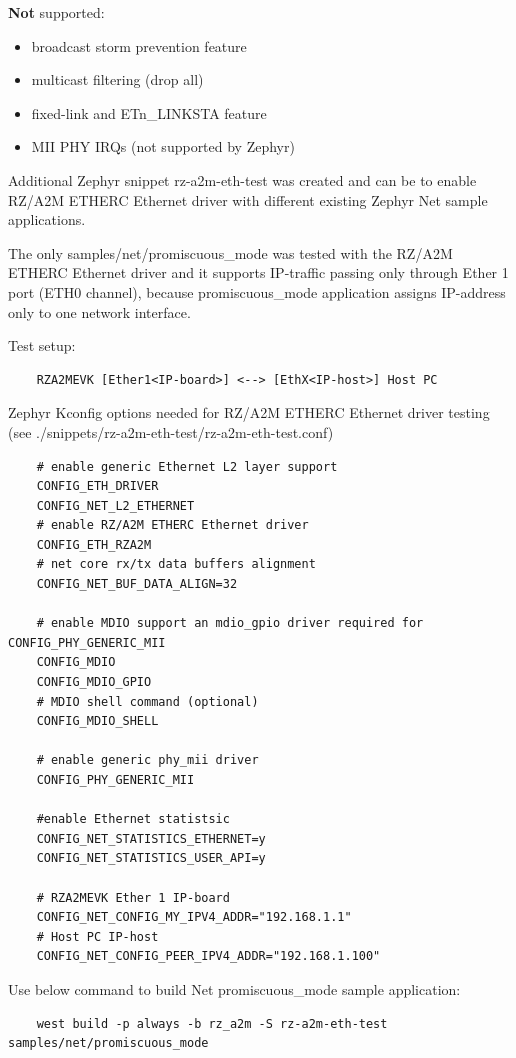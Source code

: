 \documentclass[11pt,a4paper,oneside]{article}
\begin{document}
\textbf{Not} supported:
\begin{itemize}
	\item  broadcast storm prevention feature
	\item  multicast filtering (drop all)
	\item  fixed-link and ETn\_LINKSTA feature
	\item  MII PHY IRQs (not supported by Zephyr)
\end{itemize}

Additional Zephyr snippet rz-a2m-eth-test was created and can be to enable RZ/A2M ETHERC Ethernet driver with different existing Zephyr Net sample applications.

The only samples/net/promiscuous\_mode was tested with the RZ/A2M ETHERC Ethernet driver and it supports IP-traffic passing only through Ether 1 port (ETH0 channel), because promiscuous\_mode application assigns IP-address only to one network interface.

Test setup:
\begin{lstlisting}
	RZA2MEVK [Ether1<IP-board>] <--> [EthX<IP-host>] Host PC
\end{lstlisting}

Zephyr Kconfig options needed for RZ/A2M ETHERC Ethernet driver testing (see ./snippets/rz-a2m-eth-test/rz-a2m-eth-test.conf)

\begin{lstlisting}
	# enable generic Ethernet L2 layer support
	CONFIG_ETH_DRIVER
	CONFIG_NET_L2_ETHERNET
	# enable RZ/A2M ETHERC Ethernet driver
	CONFIG_ETH_RZA2M
	# net core rx/tx data buffers alignment
	CONFIG_NET_BUF_DATA_ALIGN=32

	# enable MDIO support an mdio_gpio driver required for CONFIG_PHY_GENERIC_MII
	CONFIG_MDIO
	CONFIG_MDIO_GPIO
	# MDIO shell command (optional)
	CONFIG_MDIO_SHELL

	# enable generic phy_mii driver
	CONFIG_PHY_GENERIC_MII

	#enable Ethernet statistsic
	CONFIG_NET_STATISTICS_ETHERNET=y
	CONFIG_NET_STATISTICS_USER_API=y

	# RZA2MEVK Ether 1 IP-board
	CONFIG_NET_CONFIG_MY_IPV4_ADDR="192.168.1.1"
	# Host PC IP-host
	CONFIG_NET_CONFIG_PEER_IPV4_ADDR="192.168.1.100"
\end{lstlisting}

Use below command to build Net promiscuous\_mode sample application:

\begin{lstlisting}
	west build -p always -b rz_a2m -S rz-a2m-eth-test samples/net/promiscuous_mode
\end{lstlisting}
\end{document}
